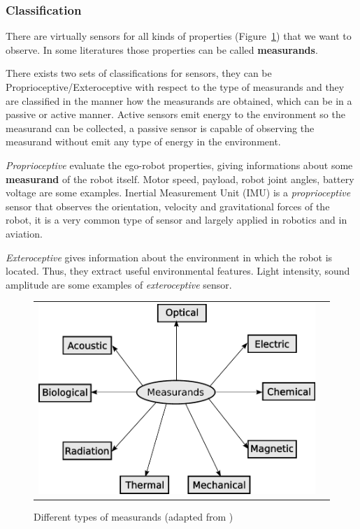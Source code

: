 \subsubsection{Classification}

There are virtually sensors for all kinds of properties (Figure~\ref{fig:sensors}) that we want to observe. In some literatures those properties can be called \textbf{measurands}\cite{riener2010sensor}. 

There exists two sets of classifications for sensors, they can be Proprioceptive/Exteroceptive with respect to the type of measurands and \cite{iyengar1991autonomous} they are classified in the manner how the measurands are obtained, which can be in a passive or active manner. Active sensors emit energy to the environment so the measurand can be collected, a passive sensor is capable of observing the measurand without emit any type of energy in the environment.

\textit{Proprioceptive} evaluate the ego-robot properties, giving informations about some \textbf{measurand} of the robot itself. Motor speed, payload, robot joint angles, battery voltage are some examples.  Inertial Measurement Unit (IMU) is a \textit{proprioceptive} sensor that observes the orientation, velocity and gravitational forces of the robot, it is a very common type of sensor and largely applied in robotics and in aviation.

\textit{Exteroceptive} gives information about the environment in which the robot is located. Thus, they extract useful environmental features. Light intensity, sound amplitude are some examples of \textit{exteroceptive} sensor.

\begin{figure}[h]
   \centering
     \begin{tabular}{lr}
       \includegraphics[scale=0.70]{img/fig:sensors}
     \end{tabular}
   \caption{Different types of measurands (adapted from \cite{WhiteRichard})}
   \label{fig:sensors}
 \end{figure}

